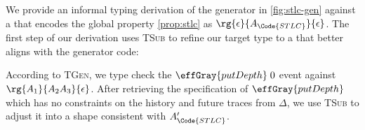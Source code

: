 
\begin{example} We provide an informal typing
  derivation of the generator in \autoref{fig:stlc-gen} against a \PAT{} that encodes the global property \ref{prop:stlc} as $\rg{\epsilon}{A_\Code{STLC}}{\epsilon}$. The first step of our derivation uses \textsc{TSub} to refine our target type to a \PAT{} that better aligns with the generator code: %
  \vspace{-.4cm} \par{}\noindent
   According to \textsc{TGen}, we type check the $\effGray{putDepth}\;0$ event against $\rg{A_1}{A_2A_3}{\epsilon}$. After retrieving the specification of $\effGray{putDepth}$ which has no constraints on the history and future traces from $\Delta$, we use \textsc{TSub} to adjust it into a shape consistent with $A_\Code{STLC}'$.
   \vspace{-.4cm} \par{}
\end{example}
